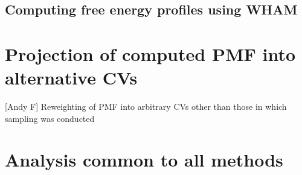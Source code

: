 \documentclass[9pt]{livecoms}
\begin{document}
\subsection{Computing free energy profiles using WHAM}
 

%

\section{Projection of computed PMF into alternative CVs}

[Andy F] Reweighting of PMF into arbitrary CVs other than those in which sampling was conducted \cite{ferguson2017bayeswham}

\section{Analysis common to all methods}
\end{document}
